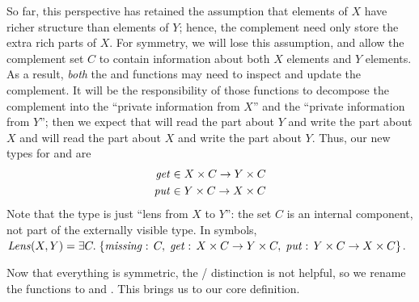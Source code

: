So far, this perspective has retained the assumption that elements of $X$
have richer structure than elements of $Y$; hence, the complement need only
store the extra rich parts of $X$. For symmetry, we will lose this
assumption, and allow the complement set $C$ to contain information about
both $X$ elements and $Y$ elements. As a result, \emph{both} the \GET{} and
\PUT{} functions may need to inspect and update the complement. It will be
the responsibility of those functions to decompose the complement into the
``private information from $X$'' and the ``private information from $Y$'';
then we expect that \GET{} will read the part about $Y$ and write the part
about $X$ and \PUT{} will read the part about $X$ and write the part about
$Y$. Thus, our new types for \GET{} and \PUT{} are
\begin{align*}
    \mathit{get} &\in X \times C \rightarrow Y \times C \\
    \mathit{put} &\in Y \times C \rightarrow X \times C
\end{align*}
Note that the type is just ``lens from $X$ to $Y$'': the set
$C$ is an internal component, not part of the externally visible type.
In symbols, $ \mathit{Lens}(X,Y) =
\exists C.\; \{ \mathord{\mathit{missing}}:\, C,\; \mathit{get}:\,X \times C \rightarrow Y
\times C,\; \mathit{put}:\,Y \times C \rightarrow X \times C \}$.

Now that everything is symmetric, the \GET{} / \PUT{} distinction is not
helpful, so we rename the functions to \PUTR{} and \PUTL.  This brings us to
our core definition.


